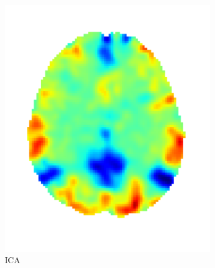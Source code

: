 \documentclass{article} %
\begin{document}
\begin{figure}
\begin{preview}
      \begin{subfigure}[b]{.3\linewidth}
        \includegraphics[width=\linewidth]{ica}%
	\vspace*{-1.8em}
        \caption{\sffamily ICA}
      \end{subfigure}
      \begin{subfigure}[b]{.3\linewidth}

\end{subfigure}
\end{preview}
\end{figure}
\end{document}
